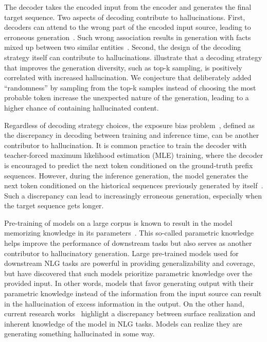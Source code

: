 The decoder takes the encoded input from the encoder and generates the final target sequence. Two aspects of decoding contribute to hallucinations. First, decoders can attend to the wrong part of the encoded input source, leading to erroneous generation~. 
Such wrong association results in generation with facts mixed up between two similar entities~.
Second, the design of the decoding strategy itself can contribute to hallucinations. 
 illustrate that a decoding strategy that improves the generation diversity, such as top-k sampling, is positively correlated with increased hallucination. We conjecture that deliberately added ``randomness'' by sampling from the top-k samples instead of choosing the most probable token increase the unexpected nature of the generation, leading to a higher chance of containing hallucinated content.

Regardless of decoding strategy choices, the exposure bias problem~, defined as the discrepancy in decoding between training and inference time, can be another contributor to hallucination. 
It is common practice to train the decoder with teacher-forced maximum likelihood estimation (MLE) training, where the decoder is encouraged to predict the next token conditioned on the ground-truth prefix sequences. However, during the inference generation, the model generates the next token conditioned on the historical sequences previously generated by itself~. Such a discrepancy can lead to increasingly erroneous generation, especially when the target sequence gets longer.

Pre-training of models on a large corpus is known to result in the model memorizing knowledge in its parameters~. This so-called parametric knowledge helps improve the performance of downstream tasks but also serves as another contributor to hallucinatory generation. Large pre-trained models used for downstream NLG tasks are powerful in providing generalizability and coverage, but  have discovered that such models prioritize parametric knowledge over the provided input. In other words, models that favor generating output with their parametric knowledge instead of the information from the input source can result in the hallucination of excess information in the output. 
On the other hand, current research works~ highlight a discrepancy between surface realization and inherent knowledge of the model in NLG tasks. Models can realize they are generating something hallucinated in some way.

